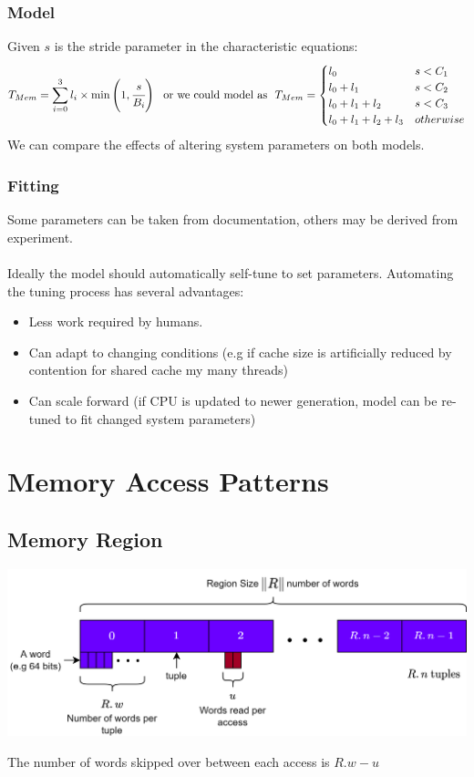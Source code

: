 \subsubsection{Model}
Given $s$ is the stride parameter in the characteristic equations:
\[T_{Mem} = \sum_{i = 0}^3 l_i \times \min\left(1, \cfrac{s}{B_i}\right) \ \text{ or we could model as } \ T_{Mem} = \begin{cases}
    l_0 & s < C_1 \\
    l_0 + l_1 & s < C_2 \\
    l_0 + l_1 + l_2 & s < C_3 \\
    l_0 + l_1 + l_2 + l_3 & otherwise \\
\end{cases}\]
We can compare the effects of altering system parameters on both models.

\subsubsection{Fitting}
Some parameters can be taken from documentation, others may be derived from experiment.
\\
\\ Ideally the model should automatically self-tune to set parameters. Automating the tuning process has several advantages:
\begin{itemize}
    \item Less work required by humans.
    \item Can adapt to changing conditions (e.g if cache size is artificially reduced by contention for shared cache my many threads)
    \item Can scale forward (if CPU is updated to newer generation, model can be re-tuned to fit changed system parameters)
\end{itemize}


\section{Memory Access Patterns}
\subsection{Memory Region}
\begin{center}
    \includegraphics[width=.8\textwidth]{modelling/images/memory_region.drawio.png}
\end{center}
\noindent The number of words skipped over between each access is $R.w - u$

